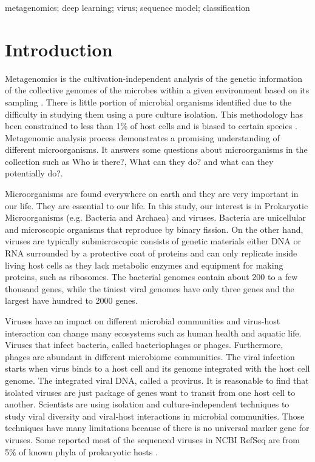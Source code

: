 \documentclass[conference]{IEEEtran}
\begin{document}
\begin{IEEEkeywords}
metagenomics; deep learning; virus; sequence model; classification 
\end{IEEEkeywords}


\section{Introduction}

Metagenomics is the cultivation-independent analysis of the genetic information of the collective genomes of the microbes within a given environment based on its sampling \cite{izard2014metagenomics}. There is little portion of microbial organisms identified due to the difficulty in studying them using a pure culture isolation. This methodology has been constrained to less than 1\% of host cells and is biased to certain species \cite{labonte2015single}.
Metagenomic analysis process demonstrates a promising understanding of different microorganisms. It answers some questions about microorganisms in the collection such as Who is there?, What can they do? and what can they potentially do?.

Microorganisms are found everywhere on earth and they are very important in our life. They are essential to our life. In this study, our interest is in Prokaryotic Microorganisms (e.g. Bacteria and Archaea) and viruses. Bacteria are unicellular and microscopic organisms that reproduce by binary fission. On the other hand, viruses are typically submicroscopic consists of genetic materials either DNA or RNA surrounded by a protective coat of proteins and can only replicate inside living host cells as they lack metabolic enzymes and equipment for making proteins, such as ribosomes. The bacterial genomes contain about 200 to a few thousand genes, while the tiniest viral genomes have only three genes and the largest have hundred to 2000 genes. 

Viruses have an impact on different microbial communities and virus-host interaction can change many ecosystems such as human health and aquatic life. Viruses that infect bacteria, called bacteriophages or phages. Furthermore, phages are abundant in different microbiome communities. The viral infection starts when virus binds to a host cell and its genome integrated with the host cell genome. The integrated viral DNA, called a provirus. It is reasonable to find that isolated viruses are just package of genes want to transit from one host cell to another. Scientists are using isolation and culture-independent techniques to study viral diversity and viral-host interactions in microbial communities. Those techniques have many limitations because of there is no universal marker gene for viruses. Some reported most of the sequenced viruses in NCBI RefSeq are from 5\% of known phyla of prokaryotic hosts \cite{roux2015viral}.
\end{document}
